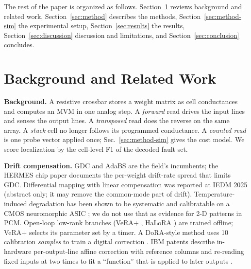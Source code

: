 \documentclass[journal]{IEEEtran}
\begin{document}
The rest of the paper is organized as follows.
Section~\ref{sec:related} reviews background and related work, Section~\ref{sec:method} describes the methods, Section~\ref{sec:method-sim} the experimental setup, Section~\ref{sec:results} the results, Section~\ref{sec:discussion} discussion and limitations, and Section~\ref{sec:conclusion} concludes.

\section{Background and Related Work}
\label{sec:related}

\textbf{Background.} A resistive crossbar stores a weight matrix as cell conductances and computes an MVM in one analog step. A \emph{forward} read drives the input lines and senses the output lines. A \emph{transposed} read does the reverse on the same array. A \emph{stuck} cell no longer follows its programmed conductance. A \emph{counted read} is one probe vector applied once; Sec.~\ref{sec:method-sim} gives the cost model. We score localization by the cell-level F1 of the decoded fault set.

\textbf{Drift compensation.} GDC \cite{legallo2018amp,joshi2020} and AdaBS \cite{joshi2020} are the field's
incumbents; the HERMES chip paper \cite{legallo2023} documents the per-weight drift-rate spread that limits GDC.
Differential mapping with linear compensation was reported at IEDM 2025 \cite{iedm2025bondi} (abstract only; it may remove the common-mode part of drift). Temperature-induced degradation has been shown to be systematic and calibratable on a CMOS neuromorphic ASIC \cite{summ2026}; we do not use that as evidence for 2-D patterns in PCM.
Open-loop low-rank branches (VeRA+ \cite{vera2026}, HaLoRA \cite{halora2025}) are trained offline;
VeRA+ selects its parameter set by a timer. A DoRA-style method uses 10 calibration \emph{samples} to train a
digital correction \cite{doracal2025}. IBM patents describe in-hardware per-output-line affine correction with reference
columns \cite{ibm11663458} and re-reading fixed inputs at two times to fit a ``function'' that is applied to later outputs \cite{ibm12272422}.
\end{document}
